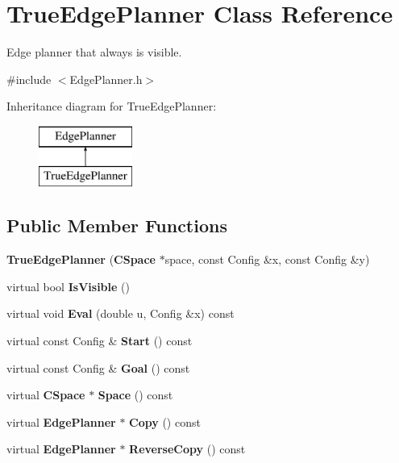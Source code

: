 \section{True\+Edge\+Planner Class Reference}
\label{classTrueEdgePlanner}


Edge planner that always is visible.  




{\ttfamily \#include $<$Edge\+Planner.\+h$>$}

Inheritance diagram for True\+Edge\+Planner\+:\begin{figure}[H]
\begin{center}
\leavevmode
\includegraphics[height=2.000000cm]{classTrueEdgePlanner}
\end{center}
\end{figure}
\subsection*{Public Member Functions}
\begin{DoxyCompactItemize}
\item 
{\bfseries True\+Edge\+Planner} ({\bf C\+Space} $\ast$space, const Config \&x, const Config \&y)\label{classTrueEdgePlanner_a2fd99e4124f4705fdca92b9ce0c0749b}

\item 
virtual bool {\bfseries Is\+Visible} ()\label{classTrueEdgePlanner_afd8dfdcf8840ed1b833922afa72c63cb}

\item 
virtual void {\bfseries Eval} (double u, Config \&x) const \label{classTrueEdgePlanner_ae06917b8ec61ed6794952e587dd4bef8}

\item 
virtual const Config \& {\bfseries Start} () const \label{classTrueEdgePlanner_a63b03c66a70d3f7a6f86d6960c7cd749}

\item 
virtual const Config \& {\bfseries Goal} () const \label{classTrueEdgePlanner_a4d00b99c03fbddfe6d91d9bcdea466d0}

\item 
virtual {\bf C\+Space} $\ast$ {\bfseries Space} () const \label{classTrueEdgePlanner_a9be1ed91f63f887e6c9d6a595af65a96}

\item 
virtual {\bf Edge\+Planner} $\ast$ {\bfseries Copy} () const \label{classTrueEdgePlanner_ae21d6d22beab7e1eba87d928c0da0258}

\item 
virtual {\bf Edge\+Planner} $\ast$ {\bfseries Reverse\+Copy} () const \label{classTrueEdgePlanner_a650f6093c6a32595ad65115959a1d125}

\end{DoxyCompactItemize}
